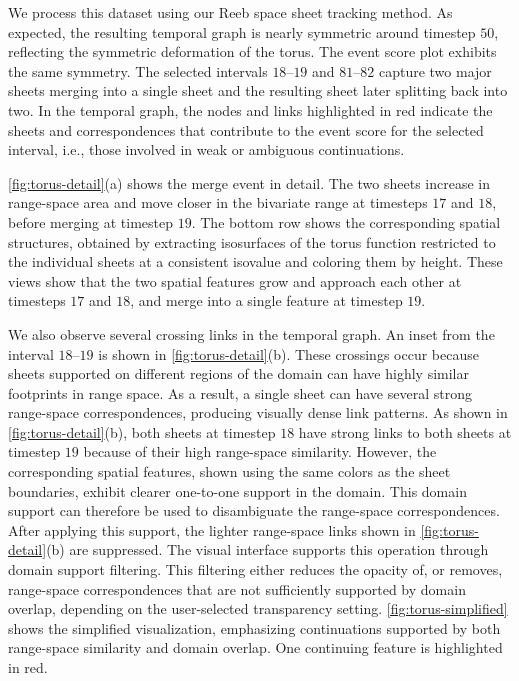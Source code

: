 \documentclass[review]{vgtc}                          %
\begin{document}
We process this dataset using our Reeb space sheet tracking method. As expected, the resulting temporal graph is nearly symmetric around timestep $50$, reflecting the symmetric deformation of the torus. The event score plot exhibits the same symmetry. The selected intervals $18$--$19$ and $81$--$82$ capture two major sheets merging into a single sheet and the resulting sheet later splitting back into two. In the temporal graph, the nodes and links highlighted in red indicate the sheets and correspondences that contribute to the event score for the selected interval, i.e., those involved in weak or ambiguous continuations.

\autoref{fig:torus-detail}(a) shows the merge event in detail. The two sheets increase in range-space area and move closer in the bivariate range at timesteps $17$ and $18$, before merging at timestep $19$. The bottom row shows the corresponding spatial structures, obtained by extracting isosurfaces of the torus function restricted to the individual sheets at a consistent isovalue and coloring them by height. These views show that the two spatial features grow and approach each other at timesteps $17$ and $18$, and merge into a single feature at timestep $19$.

We also observe several crossing links in the temporal graph. An inset from the interval $18$--$19$ is shown in \autoref{fig:torus-detail}(b). These crossings occur because sheets supported on different regions of the domain can have highly similar footprints in range space. As a result, a single sheet can have several strong range-space correspondences, producing visually dense link patterns. As shown in \autoref{fig:torus-detail}(b), both sheets at timestep $18$ have strong links to both sheets at timestep $19$ because of their high range-space similarity. However, the corresponding spatial features, shown using the same colors as the sheet boundaries, exhibit clearer one-to-one support in the domain. This domain support can therefore be used to disambiguate the range-space correspondences. After applying this support, the lighter range-space links shown in \autoref{fig:torus-detail}(b) are suppressed. The visual interface supports this operation through domain support filtering. This filtering either reduces the opacity of, or removes, range-space correspondences that are not sufficiently supported by domain overlap, depending on the user-selected transparency setting. \autoref{fig:torus-simplified} shows the simplified visualization, emphasizing continuations supported by both range-space similarity and domain overlap. One continuing feature is highlighted in red.
\end{document}
